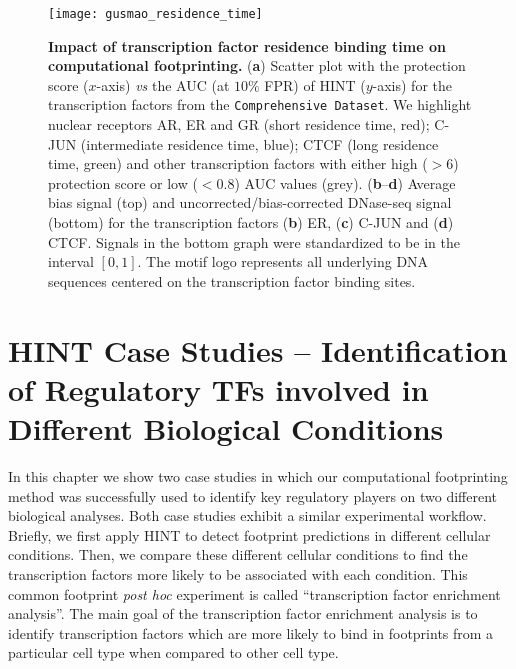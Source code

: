 \begin{figure}[h!]
\centering
\texttt{[image: gusmao\_residence\_time]}
\caption[Impact of transcription factor residence binding time on computational footprinting]{\textbf{Impact of transcription factor residence binding time on computational footprinting.} (\textbf{a}) Scatter plot with the protection score ($x$-axis) \emph{vs} the AUC (at $10\%$ FPR) of HINT ($y$-axis) for the transcription factors from the {\tt Comprehensive Dataset}. We highlight nuclear receptors AR, ER and GR (short residence time, red); C-JUN (intermediate residence time, blue); CTCF (long residence time, green) and other transcription factors with either high ($> 6$) protection score or low ($< 0.8$) AUC values (grey). (\textbf{b}--\textbf{d}) Average bias signal (top) and uncorrected/bias-corrected DNase-seq signal (bottom) for the transcription factors (\textbf{b}) ER, (\textbf{c}) C-JUN and (\textbf{d}) CTCF. Signals in the bottom graph were standardized to be in the interval $[0,1]$. The motif logo represents all underlying DNA sequences centered on the transcription factor binding sites.}
\label{fig:gusmao_residence_time}
\end{figure}






























\section{HINT Case Studies -- Identification of Regulatory TFs involved in Different Biological Conditions}
\label{sec:case.studies}

In this chapter we show two case studies in which our computational footprinting method was successfully used to identify key regulatory players on two different biological analyses. Both case studies exhibit a similar experimental workflow. Briefly, we first apply HINT to detect footprint predictions in different cellular conditions. Then, we compare these different cellular conditions to find the transcription factors more likely to be associated with each condition. This common footprint \emph{post hoc} experiment is called ``transcription factor enrichment analysis''. The main goal of the transcription factor enrichment analysis is to identify transcription factors which are more likely to bind in footprints from a particular cell type when compared to other cell type.


